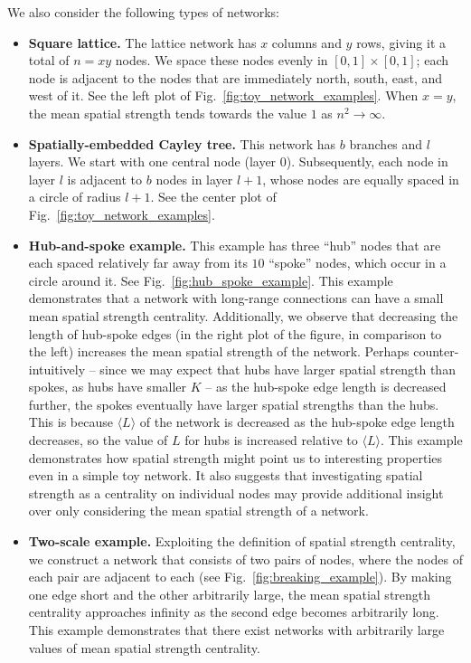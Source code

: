 \documentclass[%
 reprint,
 amsmath,amssymb,
 aps,
]{revtex4-1}
\begin{document}
We also consider the following types of networks:
\begin{itemize}
\item{\textbf{Square lattice.} The lattice network has $x$ columns and $y$ rows, giving it a total of $n = xy$ nodes. We space these nodes evenly in $[0,1] \times [0,1]$; each node is adjacent to the nodes that are immediately north, south, east, and west of it. See the left plot of Fig.~\ref{fig:toy_network_examples}. When $x=y$, the mean spatial strength tends towards the value $1$ as $n^2 \rightarrow \infty$.
}
\item{\textbf{Spatially-embedded Cayley tree.} This network has $b$ branches and $l$ layers. We start with one central node (layer $0$). Subsequently, each node in layer $l$ is adjacent to $b$ nodes in layer $l+1$, whose nodes are equally spaced in a circle of radius $l+1$. See the center plot of Fig.~\ref{fig:toy_network_examples}. 
}
\item{\textbf{Hub-and-spoke example.} This example has three ``hub'' nodes that are each spaced relatively far away from its $10$ ``spoke'' nodes, which occur in a circle around it. See Fig.~\ref{fig:hub_spoke_example}. This example demonstrates that a network with long-range connections can have a small mean spatial strength centrality. Additionally, we observe that decreasing the length of hub-spoke edges (in the right plot of the figure, in comparison to the left) increases the mean spatial strength of the network. Perhaps counter-intuitively -- since we may expect that hubs have larger spatial strength than spokes, as hubs have smaller $K$ -- as the hub-spoke edge length is decreased further, the spokes eventually have larger spatial strengths than the hubs. This is because $\langle L \rangle$ of the network is decreased as the hub-spoke edge length decreases, so the value of $L$ for hubs is increased relative to $\langle L \rangle$. This example demonstrates how spatial strength might point us to interesting properties even in a simple toy network. It also suggests that investigating spatial strength as a centrality on individual nodes may provide additional insight over only considering the mean spatial strength of a network.
}
\item{\textbf{Two-scale example.} Exploiting the definition of spatial strength centrality, we construct a network that consists of two pairs of nodes, where the nodes of each pair are adjacent to each (see Fig.~\ref{fig:breaking_example}). By making one edge short and the other arbitrarily large, the mean spatial strength centrality approaches infinity as the second edge becomes arbitrarily long. This example demonstrates that there exist networks with arbitrarily large values of mean spatial strength centrality. 
}
\end{itemize}
\end{document}
